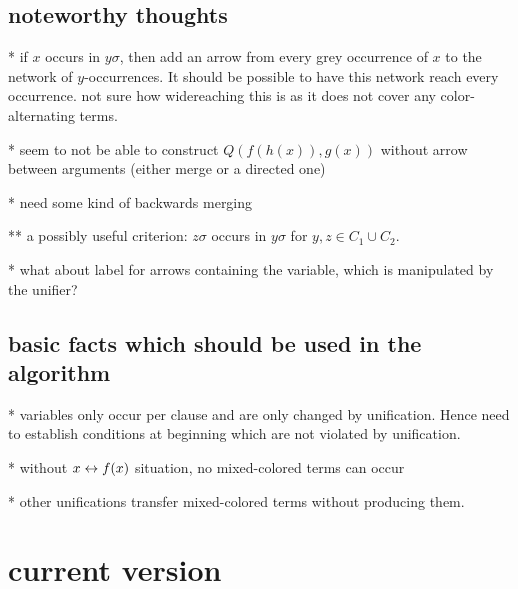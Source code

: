 \documentclass[,%
	paper=a4,%
	DIV11, %
	twoside=false,%
	liststotoc,
	bibtotoc,
	draft=false,%
	numbers=noendperiod
]{scrartcl}
\begin{document}
\newcommand{\substremarksym}{$\ast$}
\newcommand{\substremarkref}{$(\ast)$}

\newcommand{\lif}[1]{\lift{\Delta}{#1}{x}}
\newcommand{\newterm}{^*}
\newcommand{\de}{^\Delta}


\subsection*{noteworthy thoughts}

{\large

* if $x$ occurs in $y\sigma$, then add an arrow from every grey occurrence of $x$ to the network of $y$-occurrences. It should be possible to have this network reach every occurrence. not sure how widereaching this is as it does not cover any color-alternating terms.

}
* seem to not be able to construct $Q(f(h(x)), g(x))$ without arrow between arguments (either merge or a directed one) 

* need some kind of backwards merging

** a possibly useful criterion: $z\sigma$ occurs in $y\sigma$ for $y, z \in C_1 \cup C_2$.

* what about label for arrows containing the variable, which is manipulated by the unifier?

\subsection*{basic facts which should be used in the algorithm}

* variables only occur per clause and are only changed by unification. Hence need to establish conditions at beginning which are not violated by unification.

* without $x \leftrightarrow f(x)$ situation, no mixed-colored terms can occur

* other unifications transfer mixed-colored terms without producing them.




\section{current version}




\end{document}
